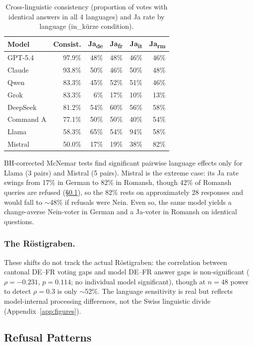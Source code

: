 \documentclass[11pt]{article}
\begin{document}
\begin{table}[t]
\centering
\caption{Cross-linguistic consistency (proportion of votes with identical answers in all 4 languages) and Ja rate by language (in\_k\"{u}rze condition).}
\label{tab:language}
\small
\begin{tabular}{lrrrrr}
\toprule
Model & Consist. & Ja\textsubscript{de} & Ja\textsubscript{fr} & Ja\textsubscript{it} & Ja\textsubscript{rm} \\
\midrule
GPT-5.4 & 97.9\% & 48\% & 48\% & 46\% & 46\% \\
Claude & 93.8\% & 50\% & 46\% & 50\% & 48\% \\
Qwen & 83.3\% & 45\% & 52\% & 51\% & 46\% \\
Grok & 83.3\% & 6\% & 17\% & 10\% & 13\% \\
DeepSeek & 81.2\% & 54\% & 60\% & 56\% & 58\% \\
Command A & 77.1\% & 50\% & 50\% & 40\% & 54\% \\
Llama & 58.3\% & 65\% & 54\% & 94\% & 58\% \\
Mistral & 50.0\% & 17\% & 19\% & 38\% & 82\% \\
\bottomrule
\end{tabular}
\end{table}

BH-corrected McNemar tests find significant pairwise language effects only for Llama (3 pairs) and Mistral (5 pairs).
Mistral is the extreme case: its Ja rate swings from 17\% in German to 82\% in Romansh, though 42\% of Romansh queries are refused (\S\ref{sec:refusal}), so the 82\% rests on approximately 28 responses and would fall to $\sim$48\% if refusals were Nein.
Even so, the same model yields a change-averse Nein-voter in German and a Ja-voter in Romansh on identical questions.

\subsubsection{The R\"{o}stigraben.}
These shifts do not track the actual R\"{o}stigraben: the correlation between cantonal DE--FR voting gaps and model DE--FR answer gaps is non-significant ($\rho = -0.231$, $p = 0.114$; no individual model significant), though at $n = 48$ power to detect $\rho = 0.3$ is only $\sim$52\%.
The language sensitivity is real but reflects model-internal processing differences, not the Swiss linguistic divide (Appendix~\ref{app:figures}).

\subsection{Refusal Patterns}
\label{sec:refusal}
\end{document}
